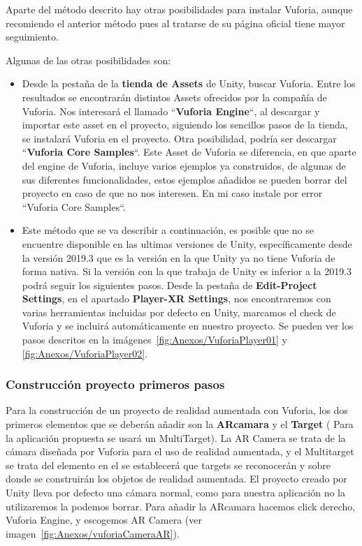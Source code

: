 Aparte del método descrito hay otras posibilidades para instalar Vuforia, aunque recomiendo el anterior método pues al tratarse de su página oficial tiene mayor seguimiento.

Algunas de las otras posibilidades son:
\begin{itemize}
	\item Desde la pestaña de la \textbf{tienda de Assets} de Unity, buscar Vuforia. Entre los resultados se encontrarán distintos Assets ofrecidos por la compañía de Vuforia. Nos interesará el llamado ``\textbf{Vuforia Engine}``, al descargar y importar este asset en el proyecto, siguiendo los sencillos pasos de la tienda, se instalará Vuforia en el proyecto.
	Otra posibilidad, podría ser descargar ``\textbf{Vuforia Core Samples}``. Este Asset de Vuforia se diferencia, en que aparte del engine de Vuforia, incluye varios ejemplos ya construidos, de algunas de sus diferentes funcionalidades, estos ejemplos añadidos se pueden borrar del proyecto en caso de que no nos interesen. En mi caso instale por error ``Vuforia Core Samples``.
	
	\item Este método que se va describir a continuación, es posible que no se encuentre disponible en las ultimas versiones de Unity, específicamente desde la versión 2019.3 que es la versión en la que Unity ya no tiene Vuforia de forma nativa. Si la versión con la que trabaja de Unity es inferior a la 2019.3 podrá seguir los siguientes pasos. Desde la pestaña de \textbf{Edit-Project Settings}, en el apartado \textbf{Player-XR Settings}, nos encontraremos con varias herramientas incluidas por defecto en Unity, marcamos el check de Vuforia y se incluirá automáticamente en nuestro proyecto. Se pueden ver los pasos descritos en la imágenes~\ref{fig:Anexos/VuforiaPlayer01} y \ref{fig:Anexos/VuforiaPlayer02}.
	
\end{itemize}



\subsubsection{Construcción proyecto primeros pasos}

Para la construcción de un proyecto de realidad aumentada con Vuforia, los dos primeros elementos que se deberán añadir son la \textbf{ARcamara} y el \textbf{Target} ( Para la aplicación propuesta se usará un MultiTarget). La AR Camera se trata de la cámara diseñada por Vuforia para el uso de realidad aumentada, y el Multitarget se trata del elemento en el se establecerá que targets se reconocerán y sobre donde se construirán los objetos de realidad aumentada.
El proyecto creado por Unity lleva por defecto una cámara normal, como para nuestra aplicación no la utilizaremos la podemos borrar.
Para añadir la ARcamara hacemos click derecho, Vuforia Engine, y escogemos AR Camera (ver imagen~\ref{fig:Anexos/vuforiaCameraAR}). 

